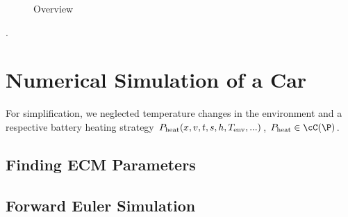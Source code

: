 \documentclass{prettytex/ox/mmsc-special-topic}
\begin{document}
  \begin{figure}[H]
    \centering
    \caption{Overview}
    \label{fig:model-overview}
  \end{figure}

  \cite{csfpaper}.

  \section{Numerical Simulation of a Car}
  For simplification, we neglected temperature changes in the environment and a respective battery heating strategy $P_{\rm heat}(x, v, t, s, h, T_{\rm env}, ...)$, $P_{\rm heat} \in \cC(\P)$.

  \subsection{Finding ECM Parameters}
  \begin{figure}[H]
    \captionsetup[subfigure]{justification=centering}
    \centering
    \hfill
    \par
  \end{figure}

  \subsection{Forward Euler Simulation}
\end{document}
